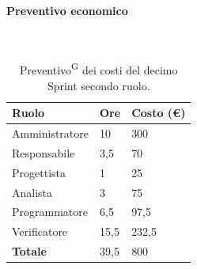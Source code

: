\documentclass[8pt]{article}
\newcommand{\glossterm}[1]{#1\textsuperscript{G}} %
\newcommand{\subsubsubsection}[1]{\paragraph{#1}\mbox{}\\}
\begin{document}
\subsubsubsection{Preventivo economico}
    \begin{table}[ht!]
	\centering
	\begin{tabular}{p{4cm} p{1cm} p{2cm}}
        \toprule
        \textbf{Ruolo} & \textbf{Ore} & \textbf{Costo (€)} \\
        \midrule
        Amministratore & 10 & 300 \\ 
        Responsabile & 3,5 & 70 \\ 
        Progettista & 1 & 25 \\ 
        Analista & 3 & 75 \\ 
        Programmatore & 6,5 & 97,5 \\ 
        Verificatore & 15,5 & 232,5 \\
        \midrule 
        \textbf{Totale} & 39,5 & 800 \\ 
        \bottomrule
    \end{tabular}
    \caption{\glossterm{Preventivo} dei costi del decimo Sprint secondo ruolo.}
	\label{table:Preventivo dei costi del decimo Sprint secondo ruolo}
\end{table}
\end{document}
